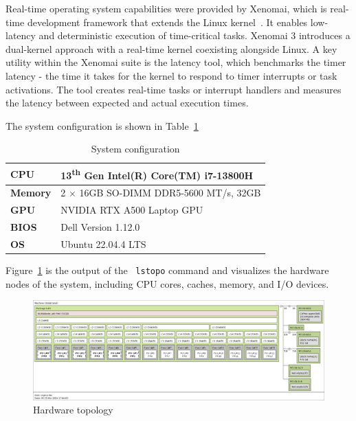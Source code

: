 \documentclass[MMR,Master,english]{twbook}
\begin{document}
\bigskip \noindent Real-time operating system capabilities were provided by Xenomai, which is real-time development framework that extends the Linux kernel~\cite{XenomaiXenomai}. It enables low-latency and deterministic execution of time-critical tasks. Xenomai 3 introduces a dual-kernel approach with a real-time kernel coexisting alongside Linux. A key utility within the Xenomai suite is the latency tool, which benchmarks the timer latency - the time it takes for the kernel to respond to timer interrupts or task activations. The tool creates real-time tasks or interrupt handlers and measures the latency between expected and actual execution times.

\clearpage 

The system configuration is shown in Table~\ref{tab:testbed_configuration}


\begin{table}[H]
	\centering
	\caption[System configuration]{System configuration}
	\label{tab:testbed_configuration}
	\setlength{\tabcolsep}{0.5em} %
	{\renewcommand{\arraystretch}{1.2}%
	\begin{tabular}{|l|l|}
	\hline
	\textbf{CPU} & 13\textsuperscript{th} Gen Intel(R) Core(TM) i7-13800H \\ \hline
	\textbf{Memory} & 2 $\times$ 16GB SO-DIMM DDR5-5600 MT/s, 32GB \\ \hline
	\textbf{GPU} & NVIDIA RTX A500 Laptop GPU \\ \hline
	\textbf{BIOS} & Dell Version 1.12.0 \\ \hline
	\textbf{OS} & Ubuntu 22.04.4 LTS \\
	\hline
	\end{tabular}}
	\end{table}

\noindent Figure~\ref{fig:lstopo} is the output of the ~\texttt{lstopo} command and visualizes the hardware nodes of the system, including CPU cores, caches, memory, and I/O devices. 
\begin{figure}[H]
	\centering
	\includegraphics[width=1.0\columnwidth]{img/lstopo.png}
	\caption[Hardware topology]{Hardware topology}
	\label{fig:lstopo}
\end{figure}
\end{document}

